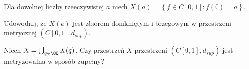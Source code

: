 \documentclass[11pt]{scrartcl}
\begin{document}
  \newpage

  \begin{zadanie*}
    Dla dowolnej liczby rzeeczywistej $a$ niech $X(a) = \left \{ f \in C[0,1] : f(0) = a \right \}$.
    \begin{walk}
    \item Udowodnij, że $X(a)$ jest zbiorem domkniętym i brzegowym w przestrzeni metrycznej $\left ( C[0,1]. d_{sup} \right )$.
    \item Niech $X = \bigcup_{q \in \QQ} X(q)$. Czy przestrzeń $X$ przestrzeni $\left ( C[0,1], d_{sup} \right )$ jest metryzowalna w sposób zupełny?
    \end{walk}
    
  \end{zadanie*}
  
    
\end{document}
